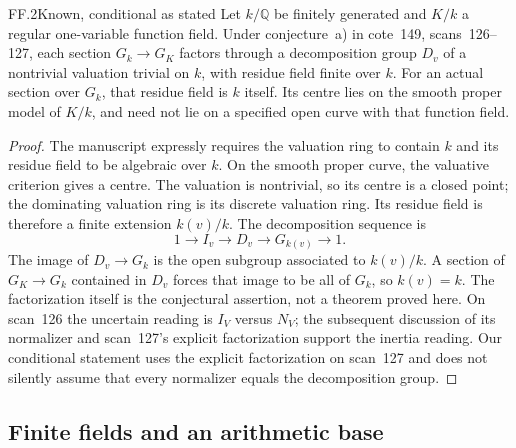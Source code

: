 \begin{claim}{FF.2}{Known, conditional as stated}\label{clm:FF2}
Let \(k/\mathbb Q\) be finitely generated and \(K/k\) a regular
one-variable function field. Under conjecture~a) in cote~149,
scans~126--127, each section \(G_k\to G_K\) factors through a
decomposition group \(D_v\) of a nontrivial valuation trivial on
\(k\), with residue field finite over \(k\). For an actual section
over \(G_k\), that residue field is \(k\) itself. Its centre lies
on the smooth proper model of \(K/k\), and need not lie on a
specified open curve with that function field.
\end{claim}
\begin{proof}
The manuscript expressly requires the valuation ring to contain
\(k\) and its residue field to be algebraic over \(k\). On the
smooth proper curve, the valuative criterion gives a centre.
The valuation is nontrivial, so its centre is a closed point;
the dominating valuation ring is its discrete valuation ring.
Its residue field is therefore a finite extension \(k(v)/k\).
The decomposition sequence is
\[
       1\longrightarrow I_v\longrightarrow D_v
         \longrightarrow G_{k(v)}\longrightarrow1.
\]
The image of \(D_v\to G_k\) is the open subgroup associated to
\(k(v)/k\). A section of \(G_K\to G_k\) contained in \(D_v\)
forces that image to be all of \(G_k\), so \(k(v)=k\).
The factorization itself is the conjectural assertion, not a theorem
proved here. On scan~126 the uncertain reading is
\(I_V\) versus \(N_V\); the subsequent discussion of its normalizer
and scan~127's explicit factorization support the inertia reading.
Our conditional statement uses the explicit factorization on
scan~127 and does not silently assume that every normalizer equals
the decomposition group.
\end{proof}

\subsection{Finite fields and an arithmetic base}

